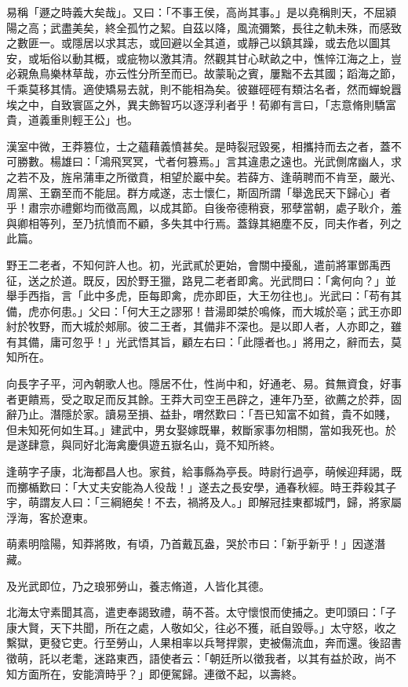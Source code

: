 
\begin{pinyinscope}
易稱「遯之時義大矣哉」。又曰：「不事王侯，高尚其事。」是以堯稱則天，不屈潁陽之高；武盡美矣，終全孤竹之絜。自茲以降，風流彌繁，長往之軌未殊，而感致之數匪一。或隱居以求其志，或回避以全其道，或靜己以鎮其躁，或去危以圖其安，或垢俗以動其概，或疵物以激其清。然觀其甘心畎畝之中，憔悴江海之上，豈必親魚鳥樂林草哉，亦云性分所至而已。故蒙恥之賓，屢黜不去其國；蹈海之節，千乘莫移其情。適使矯易去就，則不能相為矣。彼雖硜硜有類沽名者，然而蟬蛻囂埃之中，自致寰區之外，異夫飾智巧以逐浮利者乎！荀卿有言曰，「志意脩則驕富貴，道義重則輕王公」也。

漢室中微，王莽篡位，士之蘊藉義憤甚矣。是時裂冠毀冕，相攜持而去之者，蓋不可勝數。楊雄曰：「鴻飛冥冥，弋者何篡焉。」言其違患之遠也。光武側席幽人，求之若不及，旌帛蒲車之所徵賁，相望於巖中矣。若薛方、逢萌聘而不肯至，嚴光、周黨、王霸至而不能屈。群方咸遂，志士懷仁，斯固所謂「舉逸民天下歸心」者乎！肅宗亦禮鄭均而徵高鳳，以成其節。自後帝德稍衰，邪孽當朝，處子耿介，羞與卿相等列，至乃抗憤而不顧，多失其中行焉。蓋錄其絕塵不反，同夫作者，列之此篇。

野王二老者，不知何許人也。初，光武貳於更始，會關中擾亂，遣前將軍鄧禹西征，送之於道。既反，因於野王獵，路見二老者即禽。光武問曰：「禽何向？」並舉手西指，言「此中多虎，臣每即禽，虎亦即臣，大王勿往也」。光武曰：「苟有其備，虎亦何患。」父曰：「何大王之謬邪！昔湯即桀於鳴條，而大城於亳；武王亦即紂於牧野，而大城於郟鄏。彼二王者，其備非不深也。是以即人者，人亦即之，雖有其備，庸可忽乎！」光武悟其旨，顧左右曰：「此隱者也。」將用之，辭而去，莫知所在。

向長字子平，河內朝歌人也。隱居不仕，性尚中和，好通老、易。貧無資食，好事者更饋焉，受之取足而反其餘。王莽大司空王邑辟之，連年乃至，欲薦之於莽，固辭乃止。潛隱於家。讀易至損、益卦，喟然歎曰：「吾已知富不如貧，貴不如賤，但未知死何如生耳。」建武中，男女娶嫁既畢，敕斷家事勿相關，當如我死也。於是遂肆意，與同好北海禽慶俱遊五嶽名山，竟不知所終。

逢萌字子康，北海都昌人也。家貧，給事縣為亭長。時尉行過亭，萌候迎拜謁，既而擲楯歎曰：「大丈夫安能為人役哉！」遂去之長安學，通春秋經。時王莽殺其子宇，萌謂友人曰：「三綱絕矣！不去，禍將及人。」即解冠挂東都城門，歸，將家屬浮海，客於遼東。

萌素明陰陽，知莽將敗，有頃，乃首戴瓦盎，哭於巿曰：「新乎新乎！」因遂潛藏。

及光武即位，乃之琅邪勞山，養志脩道，人皆化其德。

北海太守素聞其高，遣吏奉謁致禮，萌不荅。太守懷恨而使捕之。吏叩頭曰：「子康大賢，天下共聞，所在之處，人敬如父，往必不獲，祇自毀辱。」太守怒，收之繫獄，更發它吏。行至勞山，人果相率以兵弩捍禦，吏被傷流血，奔而還。後詔書徵萌，託以老耄，迷路東西，語使者云：「朝廷所以徵我者，以其有益於政，尚不知方面所在，安能濟時乎？」即便駕歸。連徵不起，以壽終。


\end{pinyinscope}

